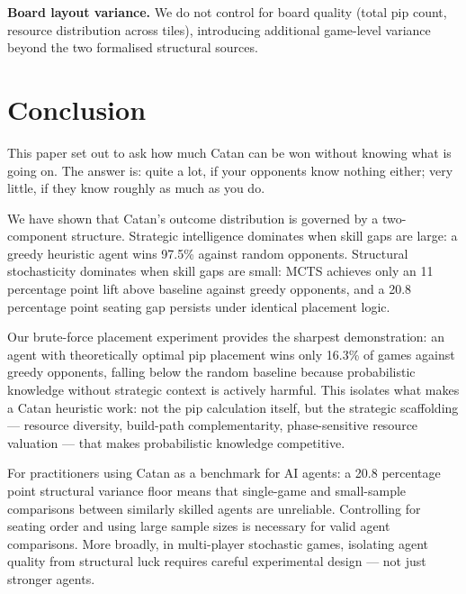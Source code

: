 \documentclass[12pt,a4paper]{article}
\begin{document}
{\textbf{Board layout variance.} We do not control for board quality
(total pip count, resource distribution across tiles), introducing
additional game-level variance beyond the two formalised structural
sources.

\section{Conclusion}

This paper set out to ask how much Catan can be won without knowing what
is going on. The answer is: quite a lot, if your opponents know nothing
either; very little, if they know roughly as much as you do.

We have shown that Catan's outcome distribution is governed by a
two-component structure. Strategic intelligence dominates when skill gaps
are large: a greedy heuristic agent wins 97.5\% against random
opponents. Structural stochasticity dominates when skill gaps are small:
MCTS achieves only an 11 percentage point lift above baseline against
greedy opponents, and a 20.8 percentage point seating gap persists under
identical placement logic.

Our brute-force placement experiment provides the sharpest demonstration:
an agent with theoretically optimal pip placement wins only 16.3\% of
games against greedy opponents, falling below the random baseline because
probabilistic knowledge without strategic context is actively harmful.
This isolates what makes a Catan heuristic work: not the pip calculation
itself, but the strategic scaffolding --- resource diversity, build-path
complementarity, phase-sensitive resource valuation --- that makes
probabilistic knowledge competitive.

For practitioners using Catan as a benchmark for AI agents: a 20.8
percentage point structural variance floor means that single-game and
small-sample comparisons between similarly skilled agents are unreliable.
Controlling for seating order and using large sample sizes is necessary
for valid agent comparisons. More broadly, in multi-player stochastic
games, isolating agent quality from structural luck requires careful
experimental design --- not just stronger agents.






}
\end{document}

